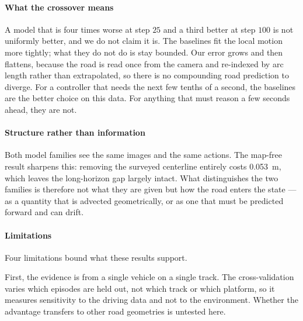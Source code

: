 
\paragraph{What the crossover means}
A model that is four times worse at step $25$ and a third better at step $100$
is not uniformly better, and we do not claim it is. The baselines fit the local
motion more tightly; what they do not do is stay bounded. Our error grows and
then flattens, because the road is read once from the camera and re-indexed by
arc length rather than extrapolated, so there is no compounding road prediction
to diverge. For a controller that needs the next few tenths of a second, the
baselines are the better choice on this data. For anything that must reason a
few seconds ahead, they are not.

\paragraph{Structure rather than information}
Both model families see the same images and the same actions. The map-free
result sharpens this: removing the surveyed centerline entirely costs
\SI{0.053}{m}, which leaves the long-horizon gap largely intact. What
distinguishes the two families is therefore not what they are given but how the
road enters the state --- as a quantity that is advected geometrically, or as
one that must be predicted forward and can drift.


\paragraph{Limitations}
Four limitations bound what these results support.

First, the evidence is from a single vehicle on a single track. The
cross-validation varies which episodes are held out, not which track or which
platform, so it measures sensitivity to the driving data and not to the
environment. Whether the advantage transfers to other road geometries is
untested here.

